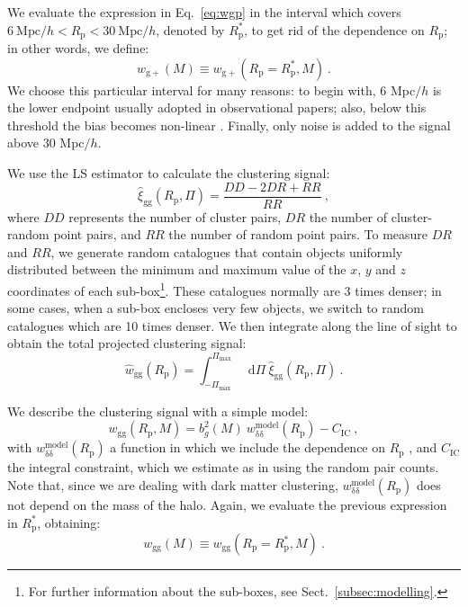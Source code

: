 \documentclass[a4paper,fleqn,usenatbib]{mnras}
\newcommand*\dif{\mathop{}\!\mathrm{d}} 	%
\begin{document}
We evaluate the expression in Eq.~\ref{eq:wgp} in the interval which covers $6 \ \mbox{Mpc}/h < R_{\mathrm{p}} < 30 \ \mbox{Mpc}/h$, denoted by $R_{\mathrm{p}}^*$, to get rid of the dependence on $R_{\mathrm{p}}$; in other words, we define:
\begin{equation}
    w_{\mathrm{g+}} (M) \equiv w_{\mathrm{g+}} (R_{\mathrm{p}} = R_{\mathrm{p}}^*, M) \ .
	\label{eq:wgpmass}
\end{equation}
We choose this particular interval for many reasons: to begin with, $6$ Mpc$/h$ is the lower endpoint usually adopted in observational papers; also, below this threshold the bias becomes non-linear \citep{Joachimietal2013b}. Finally, only noise is added to the signal above $30$ Mpc$/h$.

We use the LS \citep{LandySzalay1993} estimator to calculate the clustering signal:
\begin{equation}
    \hat{\xi}_{\mathrm{gg}}(R_{\mathrm{p}}, \Pi) = \frac{DD -2DR + RR}{RR} \ ,
	\label{eq:xigghat}
\end{equation}
where $DD$ represents the number of cluster pairs, $DR$ the number of cluster-random point pairs, and $RR$ the number of random point pairs. To measure $DR$ and $RR$, we generate random catalogues that contain objects uniformly distributed between the minimum and maximum value of the $x$, $y$ and $z$ coordinates of each sub-box\footnote{For further information about the sub-boxes, see Sect.~\ref{subsec:modelling}.}. These catalogues normally are 3 times denser; in some cases, when a sub-box encloses very few objects, we switch to random catalogues which are 10 times denser. We then integrate along the line of sight to obtain the total projected clustering signal:
\begin{equation}
   \hat{w}_{\mathrm{gg}} (R_{\mathrm{p}}) = \int _{-\Pi_{\mathrm{max}}}^{\Pi_{\mathrm{max}}} \dif \Pi \ \hat{\xi}_{\mathrm{gg}}(R_{\mathrm{p}}, \Pi) \ .
	\label{eq:wgghat}
\end{equation}

We describe the clustering signal with a simple model:
\begin{equation}
    w_{\mathrm{gg}} (R_{\mathrm{p}}, M)=b_g^2 (M)\ w_{\mathrm{\delta} \mathrm{\delta}}^{\mathrm{model}} (R_{\mathrm{p}}) - C_{\mathrm{IC}} \ , 
	\label{eq:wgg}
\end{equation}
with $w_{\mathrm{\delta} \mathrm{\delta}}^{\mathrm{model}} (R_{\mathrm{p}})$ a function in which we include the dependence on $R_{\mathrm{p}}$ \citep[equation 9]{vanUitertJoachimi2017}, and $C_{\mathrm{IC}}$ the integral constraint, which we estimate as in \citet[equation 8]{RocheEales1999} using the random pair counts. Note that, since we are dealing with dark matter clustering, $w_{\mathrm{\delta} \mathrm{\delta}}^{\mathrm{model}} (R_{\mathrm{p}})$ does not depend on the mass of the halo. Again, we evaluate the previous expression in $R_{\mathrm{p}}^*$, obtaining:
\begin{equation}
    w_{\mathrm{gg}} (M) \equiv w_{\mathrm{gg}} (R_{\mathrm{p}} = R_{\mathrm{p}}^*, M) \ .
	\label{eq:wgpmass}
\end{equation}
\end{document}
